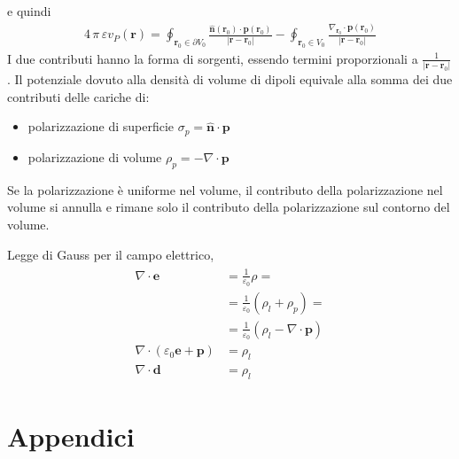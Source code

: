 \documentclass[letterpaper,10pt,italian]{jupyterBook}
\begin{document}
\sphinxAtStartPar
e quindi
\begin{equation*}
\begin{split}4 \, \pi \, \varepsilon v_P(\mathbf{r}) = \oint_{\mathbf{r}_0 \in \partial V_0} \frac{\hat{\mathbf{n}}(\mathbf{r}_0) \cdot \mathbf{p}(\mathbf{r}_0)}{|\mathbf{r}-\mathbf{r}_0|} - \oint_{\mathbf{r}_0 \in V_0} \frac{\nabla_{\mathbf{r}_0} \cdot \mathbf{p}(\mathbf{r}_0)}{|\mathbf{r} - \mathbf{r}_0|}\end{split}
\end{equation*}
\sphinxAtStartPar
I due contributi hanno la forma di sorgenti, essendo termini proporzionali a \(\frac{1}{|\mathbf{r}-\mathbf{r}_0|}\).
Il potenziale dovuto alla densità di volume di dipoli equivale alla somma dei due contributi delle cariche di:
\begin{itemize}
\item {} 
\sphinxAtStartPar
polarizzazione di superficie \(\sigma_p =   \hat{\mathbf{n}} \cdot \mathbf{p}\)

\item {} 
\sphinxAtStartPar
polarizzazione di volume     \(\rho_p   = - \nabla \cdot \mathbf{p}\)

\end{itemize}

\sphinxAtStartPar
{} Se la polarizzazione è uniforme nel volume, il contributo della polarizzazione nel volume si annulla e rimane solo il contributo della polarizzazione sul contorno del volume.

\sphinxAtStartPar
{} Legge di Gauss per il campo elettrico,
\begin{equation*}
\begin{split}\begin{aligned}
  \nabla \cdot \mathbf{e} & = \frac{1}{\varepsilon_0} \rho = \\
                          & = \frac{1}{\varepsilon_0} \left( \rho_l + \rho_p \right) = \\
                          & = \frac{1}{\varepsilon_0} \left( \rho_l - \nabla \cdot \mathbf{p} \right) \\
  \nabla \cdot \left( \varepsilon_0 \mathbf{e} + \mathbf{p} \right) & = \rho_l \\
  \nabla \cdot  \mathbf{d} & = \rho_l
\end{aligned}\end{split}
\end{equation*}
\sphinxstepscope


\part{Appendici}
\end{document}
